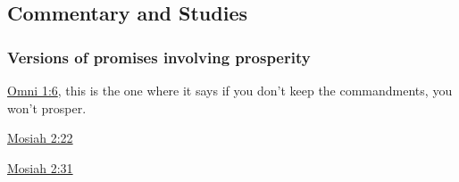 	
\subsection{Commentary and Studies} %
	\label{PROSPER-COMMENTARY}

	
		
	\subsubsection{Versions of promises involving prosperity}
		\label{PROSPER-promises}
		
		\begin{compactitem}
			\item \hyperref[OMNI-1-6]{Omni 1:6}, this is the one where it says if you don't keep the commandments, you won't prosper.
			\item \hyperref[MOSIAH-2-22]{Mosiah 2:22}
			\item \hyperref[MOSIAH-2-31]{Mosiah 2:31}
		\end{compactitem}